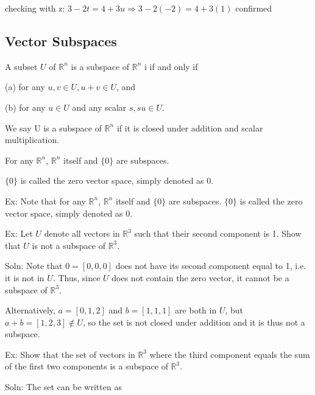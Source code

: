 \documentclass{extarticle}
\begin{document}
\begin{multicols}{4}
checking with z: $3-2t =4+3u \Rightarrow 3-2(-2)=4+3(1)$ confirmed 



\subsection{Vector Subspaces}
A subset $U$ of ${\mathbb{R}}^n$ is a subspace of ${\mathbb{R}}^n$ i if and only if

(a) for any $u, v \in U, u + v \in U$, and

(b) for any $u \in U$ and any scalar $s, su \in U$.

We say U is a subspace of ${\mathbb{R}}^n $ if it is closed under addition and scalar multiplication.

\smallskip
\smallskip



For any ${\mathbb{R}}^n $, ${\mathbb{R}}^n $ itself and $\{0\}$ are subspaces.

$\{0\}$ is called the zero vector space, simply denoted as 0.



Ex: Note that for any ${\mathbb{R}}^n $, ${\mathbb{R}}^n $ itself and $\{0\}$ are subspaces. $\{0\}$ is called the zero vector space, simply denoted as 0.

\begin{tcolorbox}[enhanced jigsaw,sharp corners,coltext=black,colback=BurntOrange!25!white,boxrule=0pt,breakable,size=minimal]



Ex: Let $U$ denote all vectors in ${\mathbb{R}}^3 $ such that their second component is 1. Show that $U$ is not a subspace of ${\mathbb{R}}^3 $.

Soln: Note that $0 = [0, 0, 0]$ does not have its second component equal to 1, i.e. it is not in $U$. Thus, since $U$ does not contain the zero vector, it cannot be a subspace of ${\mathbb{R}}^3 $.

Alternatively, $a = [0, 1, 2]$ and $b = [1, 1, 1]$ are both in $U$, but $a+b = [1, 2, 3] \notin U$, so the set is not closed under addition and it is thus not a subspace.


\end{tcolorbox}


Ex: Show that the set of vectors in ${\mathbb{R}}^3 $ where the third component equals the sum of the first two components is a subspace of ${\mathbb{R}}^3 $.

Soln: The set can be written as


\end{multicols}
\end{document}
